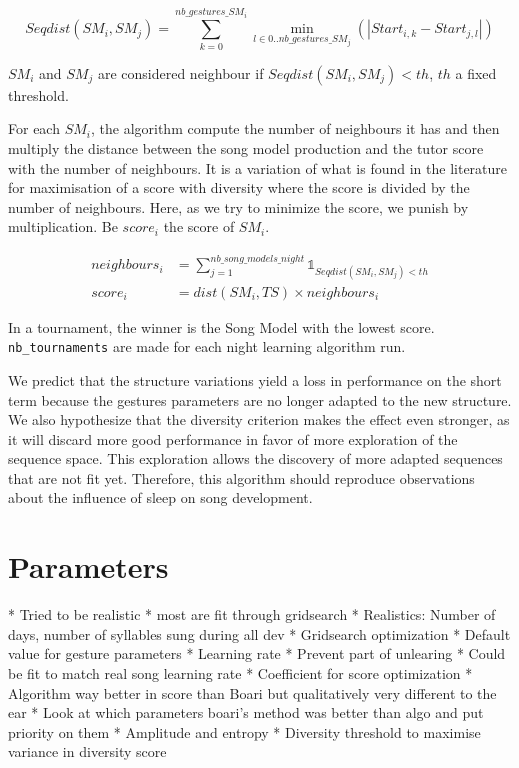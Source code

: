 \documentclass{report}
\begin{document}
\begin{equation}
  Seqdist(SM_i, SM_j) = \sum_{k=0}^{nb\_gestures\_SM_i}
      \min_{l \in 0..nb\_gestures\_SM_j}(|Start_{i,k} - Start_{j, l}|)
\end{equation}

\(SM_i\) and \(SM_j\) are considered neighbour if $Seqdist(SM_i, SM_j) < th$,
$th$ a fixed threshold.

For each $SM_i$, the algorithm compute the number of neighbours it has and then
multiply the distance between the song model production and the tutor score with
the number of neighbours. It is a variation of what is found in the literature
for maximisation of a score with diversity where the score is divided by the
number of neighbours. Here, as we try to minimize the score, we punish by
multiplication. Be $score_i$ the score of $SM_i$.

\begin{align}
  neighbours_i &= \sum_{j=1}^{nb\_song\_models\_night} \mathds{1}_{Seqdist(SM_i, SM_j) < th} \\
  score_i &= dist(SM_i, TS) \times neighbours_i
\end{align}

In a tournament, the winner is the Song Model with the lowest score.
\texttt{nb\_tournaments} are made for each night learning algorithm run.


We predict that the structure variations yield a loss in performance on the
short term because the gestures parameters are no longer adapted to the new
structure. We also hypothesize that the diversity criterion makes the effect
even stronger, as it will discard more good performance in favor of more
exploration of the sequence space. This exploration allows the discovery of more
adapted sequences that are not fit yet. Therefore, this algorithm should
reproduce \textcite{deregnaucourt_how_2005} observations about the influence of
sleep on song development.

\section{Parameters} \label{parameters}

  * Tried to be realistic
  * most are fit through gridsearch
  * Realistics: Number of days, number of syllables sung during all dev
  * Gridsearch optimization
  * Default value for gesture parameters
  * Learning rate
        * Prevent part of unlearing
      * Could be fit to match real song learning rate
      * Coefficient for score optimization
    * Algorithm way better in score than Boari but qualitatively very
  different to the ear
  * Look at which parameters boari's method was better than algo and put
  priority on them
  * Amplitude and entropy
  * Diversity threshold to maximise variance in diversity score
\end{document}
